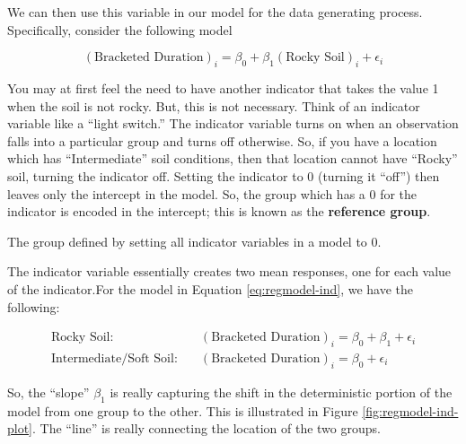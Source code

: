 \documentclass[]{book}
\theoremstyle{plain}
\theoremstyle{mydefn}
\theoremstyle{myexmpl}
\theoremstyle{remark}
\let\BeginKnitrBlock\begin \let\EndKnitrBlock\end
\let\BeginKnitrBlock\begin \let\EndKnitrBlock\end
\begin{document}
We can then use this variable in our model for the data generating
process. Specifically, consider the following model

\begin{equation}
  (\text{Bracketed Duration})_i = \beta_0 + \beta_1(\text{Rocky Soil})_i + \epsilon_i  
  \label{eq:regmodel-ind}
\end{equation}

You may at first feel the need to have another indicator that takes the
value 1 when the soil is not rocky. But, this is not necessary. Think of
an indicator variable like a ``light switch.'' The indicator variable
turns on when an observation falls into a particular group and turns off
otherwise. So, if you have a location which has ``Intermediate'' soil
conditions, then that location cannot have ``Rocky'' soil, turning the
indicator off. Setting the indicator to 0 (turning it ``off'') then
leaves only the intercept in the model. So, the group which has a 0 for
the indicator is encoded in the intercept; this is known as the
\textbf{reference group}.

\BeginKnitrBlock{definition}[Reference Group]
\protect\hypertarget{def:defn-reference-group}{}{\label{def:defn-reference-group}
{} }The group defined by setting all
indicator variables in a model to 0.
\EndKnitrBlock{definition}

The indicator variable essentially creates two mean responses, one for
each value of the indicator.For the model in Equation
\eqref{eq:regmodel-ind}, we have the following:

\[
\begin{aligned}
  \text{Rocky Soil:} &\quad (\text{Bracketed Duration})_i = \beta_0 + \beta_1 + \epsilon_i\\
  \text{Intermediate/Soft Soil:} &\quad (\text{Bracketed Duration})_i = \beta_0 + \epsilon_i
\end{aligned}
\]

So, the ``slope'' \(\beta_1\) is really capturing the shift in the
deterministic portion of the model from one group to the other. This is
illustrated in Figure \ref{fig:regmodel-ind-plot}. The ``line'' is
really connecting the location of the two groups.
\end{document}
